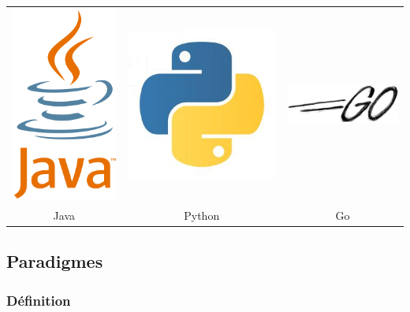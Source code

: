 \begin{tabular}{ccc}
\includegraphics[scale=0.4]{img/java} &
\includegraphics[scale=0.5]{img/python.jpeg} &
\includegraphics[scale=0.8]{img/go}\\
Java & Python & Go
\end{tabular}

\subsection{Paradigmes}
\label{paradigmes}

\subsubsection{Définition}

